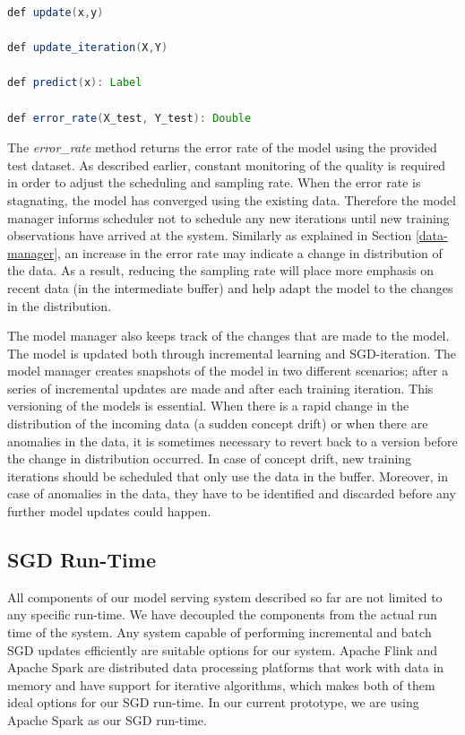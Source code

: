 \documentclass{vldb}
\begin{document}
\noindent\begin{minipage}[t]{\linewidth}
\begin{lstlisting}[language=java, basicstyle=\small\ttfamily, frame=tb ,columns=fullflexible,
showstringspaces=false,label=model-manager-api,caption=Model Manager API, numberstyle=\tiny]
def update(x,y)

def update_iteration(X,Y)

def predict(x): Label

def error_rate(X_test, Y_test): Double

\end{lstlisting}
\end{minipage}


The \textit{error\_rate} method returns the error rate of the model using the provided test dataset.
As described earlier, constant monitoring of the quality is required in order to adjust the scheduling and sampling rate.
When the error rate is stagnating, the model has converged using the existing data.
Therefore the model manager informs scheduler not to schedule any new iterations until new training observations have arrived at the system.
Similarly as explained in Section \ref{data-manager}, an increase in the error rate may indicate a change in distribution of the data.
As a result, reducing the sampling rate will place more emphasis on recent data (in the intermediate buffer) and help adapt the model to the changes in the distribution.

The model manager also keeps track of the changes that are made to the model.
The model is updated both through incremental learning and SGD-iteration.
The model manager creates snapshots of the model in two different scenarios; after a series of incremental updates are made and after each training iteration.
This versioning of the models is essential.
When there is a rapid change in the distribution of the incoming data (a sudden concept drift) or when there are anomalies in the data, it is sometimes necessary to revert back to a version before the change in distribution occurred.
In case of concept drift, new training iterations should be scheduled that only use the data in the buffer.
Moreover, in case of anomalies in the data, they have to be identified and discarded before any further model updates could happen.

\subsection{SGD Run-Time} 
All components of our model serving system described so far are not limited to any specific run-time.
We have decoupled the components from the actual run time of the system.
Any system capable of performing incremental and batch SGD updates efficiently are suitable options for our system.
Apache Flink \cite{carbone2015apache} and Apache Spark \cite{zaharia2010spark} are distributed data processing platforms that work with data in memory and have support for iterative algorithms, which makes both of them ideal options for our SGD run-time.
In our current prototype, we are using Apache Spark \cite{zaharia2010spark} as our SGD run-time.
\end{document}
